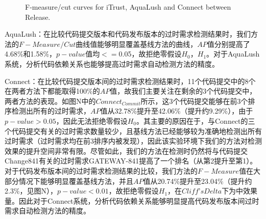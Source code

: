 \begin{figure}[t]
   \caption{F-measure/cut curves for iTrust, AquaLush and Connect between Release.}
   \label{fmeasure_release}
\end{figure}

AquaLush：在比较代码提交版本和代码发布版本的过时需求检测结果时，我们方法的$F-Measure/Cut$曲线值能够明显覆盖基线方法的曲线，$AP$值分别提高了4.68\%和1.58\%，$p-value$值均$<=0$.05，故拒绝零假设$H_{0}$，$H_{1}$。对于AquaLush系统，分析代码依赖关系也能够提高过时需求自动检测方法的精度。

Connect：在比较代码提交版本间的过时需求检测结果时，11个代码提交中的8个在两者方法下都能取得100\%的$AP$值，故我们主要关注在剩余的3个代码提交中，两者方法的表现。如图N中的$Connect_{Commit}$所示，这3个代码提交能够在前3个排序检测出所有的过时需求，$AP$值从32.78\%提升至42.06\%（提升约9.29\%），由于$p-value > 0.05$，因此无法拒绝零假设$H_{0}$。其主要的原因在于，与Connect的三个代码提交有关的过时需求数量较少，且基线方法已经能够较为准确地检测出所有过时需求（过时需求均在前3排序内被发现），因此该实验环境下我们的方法对检测效果的提升空间非常有限。尽管如此，我们的方法在检测时仍然将与代码提交Change841有关的过时需求GATEWAY-841提高了一个排名（从第2提升至第1）。对于代码发布版本间的过时需求检测结果的比较，我们方法的$F-Measure$值在大部分情况下能够明显覆盖基线方法，并且$AP$值从20.74\%提升至23.04\%（提升约2.3\%，见图N），$p-value<0.01$，故拒绝零假设$H_{1}$，在$Cliff’s Delta$下为中效果量。因此对于Connect系统，分析代码依赖关系能够明显提高代码发布版本间过时需求自动检测方法的精度。

